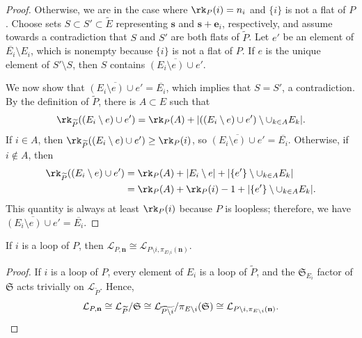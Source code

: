 \begin{proof}
Otherwise, we are in the case where $\rk_P(i) = n_i$ and $\{i\}$ is not a flat of $P$.
Choose sets $S \subset S' \subset \widetilde E$ representing $\mathbf s$ and $\mathbf s + \mathbf e_i$, respectively, and
assume towards a contradiction that $S$ and $S'$ are both flats of $\widetilde P$.
Let $e'$ be an element of $\overline{E_i} \setminus E_i$, which is nonempty because $\{i\}$ is not a flat of $P$.
If $e$ is the unique element of $S' \setminus S$, then $S$ contains $\overline{(E_i \setminus e) \cup e'}$.

We now show that $\overline{(E_i \setminus e) \cup e'} = \overline{E_i}$, which implies that $S = S'$, a contradiction.
By the definition of $\widetilde P$, there is $A \subset E$ such that
\[
  \rk_{\widetilde P}((E_i \setminus e) \cup e') = \rk_P(A) + |((E_i \setminus e) \cup e') \setminus \cup_{k \in A} E_k|.
\]
If $i \in A$, then $\rk_{\widetilde P}((E_i \setminus e) \cup e') \geq \rk_P(i)$, so $\overline{(E_i \setminus e) \cup e'} = \overline{E_i}$.
Otherwise, if $i \not \in A$, then
\begin{align*}
\rk_{\widetilde P}((E_i \setminus e) \cup e') &= \rk_P(A) + |E_i \setminus e| + |\{e'\} \setminus \cup_{k \in A} E_k|\\
&= \rk_P(A) + \rk_P(i) - 1 + |\{e'\} \setminus \cup_{k \in A} E_k|. 
\end{align*}
This quantity is always at least $\rk_P(i)$ because $P$ is loopless; therefore, we have $\overline{(E_i\setminus e) \cup e'} = \overline{E_i}$.
\end{proof}
\begin{lemm}\label{deloop}
  If $i$ is a loop of $P$, then $ \mathcal L_{P, \mathbf n} \cong \mathcal L_{P\setminus i, \pi_{E \setminus i}(\mathbf n)}$.
\end{lemm}
\begin{proof}
  If $i$ is a loop of $P$, every element of $E_i$ is a loop of $\widetilde P$, and the $\mathfrak S_{E_i}$ factor of $\mathfrak S$ acts trivially on $\mathcal L_{\widetilde P}$.
  Hence,
  \[
  \mathcal L_{P, \mathbf n} \cong \mathcal L_{\widetilde P} / \mathfrak S  \cong \mathcal L_{\widetilde{P \setminus i}} /  \pi_{E \setminus i}(\mathfrak S) \cong \mathcal L_{P\setminus i, \pi_{E \setminus i}(\mathbf n)}.\qedhere
  \]
\end{proof}

